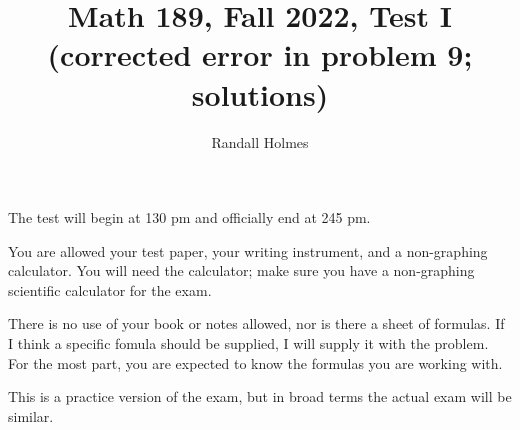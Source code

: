 \documentclass[12pt]{article}
\title{Math 189, Fall 2022, Test I (corrected error in problem 9; solutions)}
\author{Randall Holmes}
\begin{document}
\maketitle

The test will begin at 130 pm and officially end at 245 pm.

You are allowed your test paper, your writing instrument, and a non-graphing calculator.  You will need the calculator;
make sure you have a non-graphing scientific calculator for the exam.

There is no use of your book or notes allowed, nor is there a sheet of formulas.  If I think a specific fomula should be supplied, I will supply it with the problem.  For the most part, you are expected to know the formulas you are working with.


This is a practice version of the exam, but in broad terms the actual exam will be similar.
\newpage
\end{document}
